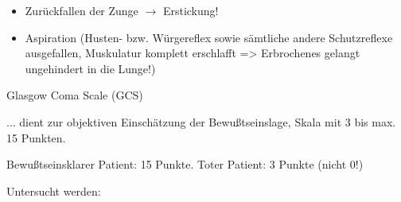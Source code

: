 \documentclass{article}
\begin{document}
\begin{itemize}
\item Zur\"uckfallen der Zunge ${\rightarrow}$ Erstickung!

\item Aspiration  (Husten- bzw. W\"urgereflex sowie  s\"amtliche andere
Schutzreflexe ausgefallen,  Muskulatur komplett erschlafft
={\textgreater}  Erbrochenes gelangt ungehindert in die  Lunge!)

\end{itemize}
Glasgow Coma Scale (GCS)

... dient zur objektiven Einsch\"atzung der Bewu{\ss}tseinslage, Skala
mit 3 bis max. 15 Punkten.

Bewu{\ss}tseinsklarer Patient: 15 Punkte. Toter Patient: 3 Punkte (nicht
0!)

Untersucht werden: 
\end{document}

